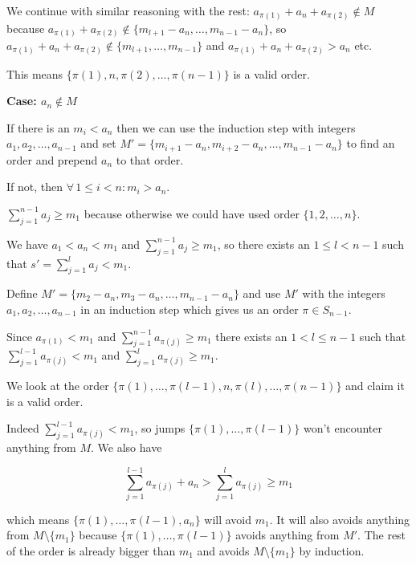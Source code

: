 We continue with similar reasoning with the rest: $a_{\pi(1)} + a_n + a_{\pi(2)} \notin M$ because $a_{\pi(1)} + a_{\pi(2)} \notin \{m_{l+1} - a_n, \ldots, m_{n-1} - a_n\}$, so  $a_{\pi(1)} + a_n + a_{\pi(2)} \notin \{m_{l+1}, \ldots, m_{n-1}\}$ and $a_{\pi(1)} + a_n + a_{\pi(2)} > a_n$ etc. 

This means $\{\pi(1), n, \pi(2), \ldots, \pi(n-1)\}$ is a valid order.

\noindent \textbf{Case: $a_n \notin M$}

If there is an $m_i < a_n$ then we can use the induction step with integers $a_1, a_2, \ldots, a_{n-1}$ and set $ M' = \{m_{i+1} - a_n, m_{i + 2} - a_n, \ldots, m_{n-1} - a_n\}$ to find an order and prepend $a_n$ to that order.

If not, then $\forall\, 1 \leq i < n: m_i > a_n$.

$\sum_{j = 1}^{n-1} a_j \geq m_1$ because otherwise we could have used order $\{1, 2, \ldots, n\}$.

We have $a_1 < a_n < m_1$ and $\sum_{j = 1}^{n-1} a_j \geq m_1$, so there exists an $1 \leq l < n - 1$ such that $s' = \sum_{j = 1}^l a_j < m_1$.

Define $M' = \{m_2 - a_n, m_3 - a_n, \ldots, m_{n-1} - a_n\}$ and use $M'$ with the integers $a_1, a_2, \ldots, a_{n-1}$ in an induction step which gives us an order $\pi \in S_{n-1}$.

Since $a_{\pi(1)} < m_1$ and $\sum_{j = 1}^{n-1} a_{\pi(j)} \geq m_1$ there exists an $1 < l \leq n - 1$ such that $\sum_{j = 1}^{l-1} a_{\pi(j)} < m_1$ and $\sum_{j = 1}^{l} a_{\pi(j)} \geq m_1$.


We look at the order $\{\pi(1), \ldots, \pi(l-1), n, \pi(l), \ldots, \pi(n-1)\}$ and claim it is a valid order.

Indeed $\sum_{j = 1}^{l-1} a_{\pi(j)} < m_1$, so jumps $\{\pi(1), \ldots, \pi(l-1)\}$ won't encounter anything from $M$. We also have

$$
\sum_{j = 1}^{l-1} a_{\pi(j)} + a_n > \sum_{j = 1}^{l} a_{\pi(j)} \geq m_1
$$

which means $\{\pi(1), \ldots, \pi(l-1), a_n\}$ will avoid $m_1$. It will also avoids anything from $M \setminus \{m_1\}$ because $\{\pi(1), \ldots, \pi(l-1)\}$ avoids anything from $M'$. The rest of the order is already bigger than $m_1$ and avoids $M \setminus \{m_1\}$ by induction.






